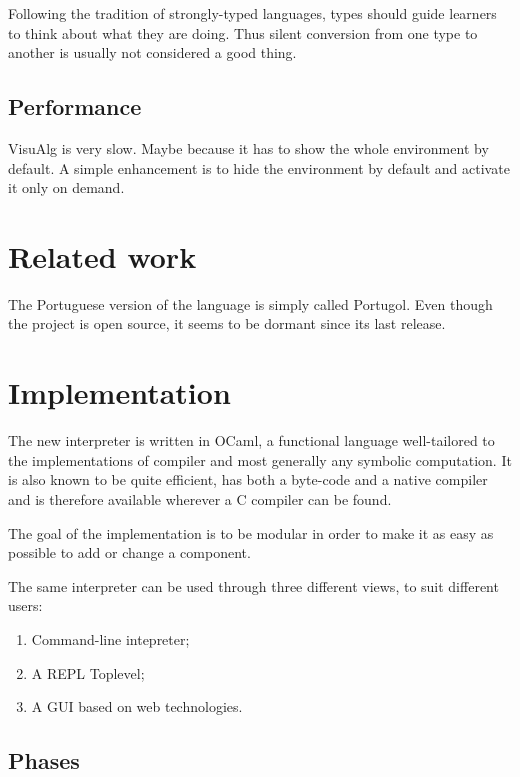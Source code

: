 \documentclass[11pt]{article}
\begin{document}
Following the tradition of strongly-typed languages, types should guide
learners to think about what they are doing. Thus silent conversion from one
type to another is usually not considered a good thing.


\subsection{Performance}
\label{sec-3-2}

VisuAlg is very slow. Maybe because it has to show the whole environment by
default. A simple enhancement is to hide the environment by default and
activate it only on demand.


\section{Related work}
\label{sec-4}

The Portuguese version of the language is simply called Portugol. Even though
the project is open source, it seems to be dormant since its last release.

\section{Implementation}
\label{sec-5}

The new interpreter is written in OCaml, a functional language well-tailored
to the implementations of compiler and most generally any symbolic
computation. It is also known to be quite efficient, has both a byte-code and
a native compiler and is therefore available wherever a C compiler can be
found.

The goal of the implementation is to be modular in order to make it as easy as
possible to add or change a component.

The same interpreter can be used through three different views, to suit
different users:

\begin{enumerate}
\item Command-line intepreter;
\item A REPL Toplevel;
\item A GUI based on web technologies.
\end{enumerate}


\subsection{Phases}
\label{sec-5-1}
\end{document}
